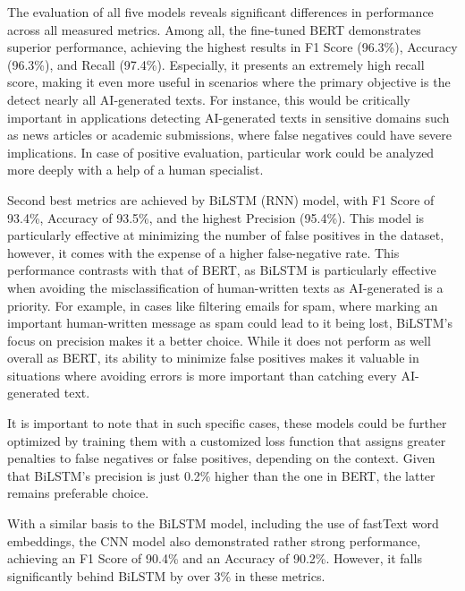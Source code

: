\vspace{3mm}

The evaluation of all five models reveals significant differences in performance across all measured metrics. Among all, the fine-tuned BERT demonstrates superior performance, achieving the highest results in F1 Score (96.3\%), Accuracy (96.3\%), and Recall (97.4\%). Especially, it presents an extremely high recall score, making it even more useful in scenarios where the primary objective is the detect nearly all AI-generated texts. For instance, this would be critically important in applications detecting AI-generated texts in sensitive domains such as news articles or academic submissions, where false negatives could have severe implications. In case of positive evaluation, particular work could be analyzed more deeply with a help of a human specialist.

\vspace{3mm}

Second best metrics are achieved by BiLSTM (RNN) model, with F1 Score of 93.4\%, Accuracy of 93.5\%, and the highest Precision (95.4\%). This model is particularly effective at minimizing the number of false positives in the dataset, however, it comes with the expense of a higher false-negative rate. This performance contrasts with that of BERT, as BiLSTM is particularly effective when avoiding the misclassification of human-written texts as AI-generated is a priority. For example, in cases like filtering emails for spam, where marking an important human-written message as spam could lead to it being lost, BiLSTM’s focus on precision makes it a better choice. While it does not perform as well overall as BERT, its ability to minimize false positives makes it valuable in situations where avoiding errors is more important than catching every AI-generated text.

\vspace{3mm}

It is important to note that in such specific cases, these models could be further optimized by training them with a customized loss function that assigns greater penalties to false negatives or false positives, depending on the context. Given that BiLSTM's precision is just 0.2\% higher than the one in BERT, the latter remains preferable choice.

\vspace{3mm}

With a similar basis to the BiLSTM model, including the use of fastText word embeddings, the CNN model also demonstrated rather strong performance, achieving an F1 Score of 90.4\% and an Accuracy of 90.2\%. However, it falls significantly behind BiLSTM by over 3\% in these metrics.

